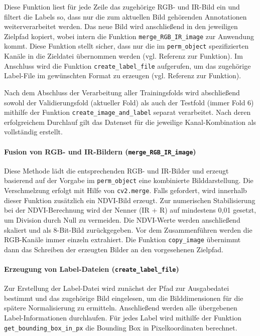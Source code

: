 Diese Funktion liest für jede Zeile das zugehörige RGB- und IR-Bild ein und filtert die Labels so, dass nur die zum aktuellen Bild gehörenden Annotationen weiterverarbeitet werden. Das neue Bild wird anschließend in den jeweiligen Zielpfad kopiert, wobei intern die Funktion \texttt{merge\_RGB\_IR\_image} zur Anwendung kommt. Diese Funktion stellt sicher, dass nur die im \texttt{perm\_object} spezifizierten Kanäle in die Zieldatei übernommen werden (vgl. Referenz zur Funktion). Im Anschluss wird die Funktion \texttt{create\_label\_file} aufgerufen, um das zugehörige Label-File im gewünschten Format zu erzeugen (vgl.  Referenz zur Funktion).

Nach dem Abschluss der Verarbeitung aller Trainingsfolds wird abschließend sowohl der Validierungsfold (aktueller Fold) als auch der Testfold (immer Fold 6) mithilfe der Funktion \texttt{create\_image\_and\_label} separat verarbeitet. Nach deren erfolgreichem Durchlauf gilt das Datenset für die jeweilige Kanal-Kombination als vollständig erstellt.

\paragraph{Fusion von RGB- und IR-Bildern (\texttt{merge\_RGB\_IR\_image})}

Diese Methode lädt die entsprechenden RGB- und IR-Bilder und erzeugt basierend auf der Vorgabe im \texttt{perm\_object} eine kombinierte Bilddarstellung. Die Verschmelzung erfolgt mit Hilfe von \texttt{cv2.merge}. Falls gefordert, wird innerhalb dieser Funktion zusätzlich ein NDVI-Bild erzeugt. Zur numerischen Stabilisierung bei der NDVI-Berechnung wird der Nenner (IR + R) auf mindestens 0{,}01 gesetzt, um Division durch Null zu vermeiden. Die NDVI-Werte werden anschließend skaliert und als 8-Bit-Bild zurückgegeben. Vor dem Zusammenführen werden die RGB-Kanäle immer einzeln extrahiert. Die Funktion \texttt{copy\_image} übernimmt dann das Schreiben der erzeugten Bilder an den vorgesehenen Zielpfad.

\paragraph{Erzeugung von Label-Dateien (\texttt{create\_label\_file})}

Zur Erstellung der Label-Datei wird zunächst der Pfad zur Ausgabedatei bestimmt und das zugehörige Bild eingelesen, um die Bilddimensionen für die spätere Normalisierung zu ermitteln. Anschließend werden alle übergebenen Label-Informationen durchlaufen. Für jedes Label wird mithilfe der Funktion \texttt{get\_bounding\_box\_in\_px} die Bounding Box in Pixelkoordinaten berechnet.

